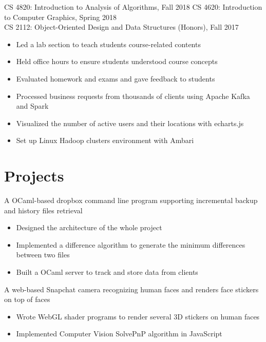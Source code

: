 \documentclass{resume}
\begin{document}
CS 4820: Introduction to Analysis of Algorithms, Fall 2018 
CS 4620: Introduction to Computer Graphics, Spring 2018\\
CS 2112: Object-Oriented Design and Data Structures (Honors), Fall 2017
\begin{itemize}
  \item Led a lab section to teach students course-related contents
  \item Held office hours to ensure students understood course concepts
  \item Evaluated homework and exams and gave feedback to students
\end{itemize}

\begin{itemize}
  \item Processed business requests from thousands of clients using Apache Kafka and Spark
  \item Visualized the number of active users and their locations with echarts.js
  \item Set up Linux Hadoop clusters environment with Ambari
\end{itemize}

\section{Projects}
A OCaml-based dropbox command line program supporting incremental backup and history files retrieval
\begin{itemize}
  \item Designed the architecture of the whole project
  \item Implemented a difference algorithm to generate the minimum differences between two files
  \item Built a OCaml server to track and store data from clients
\end{itemize}
A web-based Snapchat camera recognizing human faces and renders face stickers on top of faces
\begin{itemize}
  \item Wrote WebGL shader programs to render several 3D stickers on human faces
  \item Implemented Computer Vision SolvePnP algorithm in JavaScript
\end{itemize}
\end{document}
